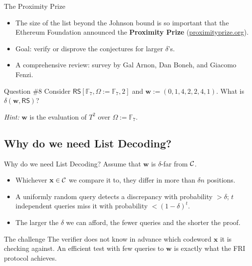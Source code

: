 \documentclass{zkdl-presentation-template}
\begin{document}
    \begin{frame}{The Proximity Prize}
        \begin{itemize}
            \item The size of the list beyond the Johnson bound is so important that the Ethereum Foundation announced the \textbf{Proximity Prize} (\href{https://proximityprize.org/}{proximityprize.org}).\pause
            \item Goal: verify or disprove the conjectures for larger $\delta$'s.\pause
            \item A comprehensive review: survey by Gal Arnon, Dan Boneh, and Giacomo Fenzi.
        \end{itemize}
        \pause

        \begin{questionblock}{Question \#8}
            Consider $\mathsf{RS}[\mathbb{F}_7,\Omega:=\mathbb{F}_7,2]$ and $\mathbf{w} := (0,1,4,2,2,4,1)$. What is $\delta(\mathbf{w}, \mathsf{RS})$?

            \textit{Hint:} $\mathbf{w}$ is the evaluation of $T^2$ over $\Omega := \mathbb{F}_7$.
        \end{questionblock}
    \end{frame}

    \subsection{Why do we need List Decoding?}

    \begin{frame}{Why do we need List Decoding?}
        Assume that $\mathbf{w}$ is $\delta$-far from $\mathcal{C}$.
        \begin{itemize}
            \item Whichever $\mathbf{x} \in \mathcal{C}$ we compare it to, they differ in more than $\delta n$ positions.\pause
            \item A uniformly random query detects a discrepancy with probability $> \delta$; $t$ independent queries miss it with probability $< (1-\delta)^t$.\pause
            \item The larger the $\delta$ we can afford, the fewer queries and the shorter the proof.
        \end{itemize}
        \pause

        \begin{alertblock}{The challenge}
            The verifier does not know in advance which codeword $\mathbf{x}$ it is checking against. An efficient test with few queries to $\mathbf{w}$ is exactly what the FRI protocol achieves.
        \end{alertblock}
    \end{frame}
\end{document}
